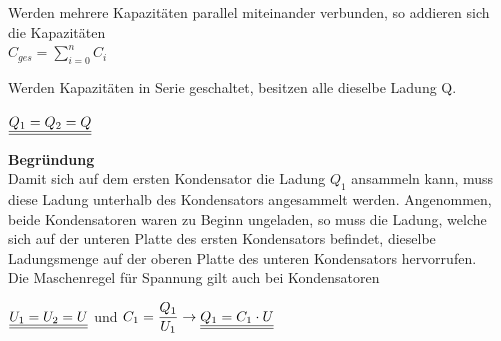\beginip
Werden mehrere Kapazitäten parallel miteinander verbunden, so addieren sich die Kapazitäten \\
\formulaBegin
$\displaystyle C_{ges} = \sum_{i=0}^n C_i $
\formulaEnd
\iend

\beginip
Werden Kapazitäten in Serie geschaltet, besitzen alle dieselbe Ladung Q.
\begin{center}
	\fix
	 $\displaystyle \underline{\underline{Q_1 = Q_2 = Q}}$
\end{center}
\iend

\textbf{Begründung} \\
Damit sich auf dem ersten Kondensator die Ladung $Q_1$ ansammeln kann, muss diese Ladung unterhalb des Kondensators angesammelt werden. Angenommen, beide Kondensatoren waren zu Beginn ungeladen,
so muss die Ladung, welche sich auf der unteren Platte des ersten Kondensators befindet, dieselbe Ladungsmenge auf der oberen Platte des unteren Kondensators hervorrufen. \\
\fix
\fix
\fix
{}
\beginip
Die Maschenregel für Spannung gilt auch bei Kondensatoren
\begin{center}
	\fix
	$\displaystyle \underline{\underline{U_1 = U_2 = U}} $  und  $\displaystyle C_1 = \frac{Q_1}{U_1} \rightarrow \underline{\underline{Q_1 = C_1 \cdot U}}$
\end{center}
\iend
